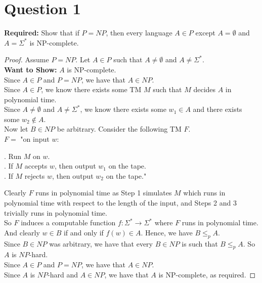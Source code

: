 \documentclass[12pt]{article}
\begin{document}

\setlength\parindent{0pt}

\section*{Question 1}

\textbf{Required:} Show that if $P = NP$, then every language $A \in P$ except $A = \emptyset$ and $A = \Sigma^*$ is NP-complete.

\begin{proof}
Assume $P = NP$. Let $A \in P$ such that $A \neq \emptyset$ and $A \neq \Sigma^*$. \\

\textbf{Want to Show:} $A$ is NP-complete. \\

Since $A \in P$ and $P = NP$, we have that $A \in NP$. \\

Since $A \in P$, we know there exists some TM $M$ such that $M$ decides $A$ in polynomial time. \\

Since $A \neq \emptyset$ and $A \neq \Sigma^*$, we know there exists some $w_1 \in A$ and there exists some $w_2 \not \in A$. \\

Now let $B \in NP$ be arbitrary. Consider the following TM $F$. \\

$F = $ "on input $w$: \\

\setlength\parindent{15pt}

. Run $M$ on $w$. \\
. If $M$ accepts $w$, then output $w_1$ on the tape. \\
. If $M$ rejects $w$, then output $w_2$ on the tape." \\

\setlength\parindent{0pt}

Clearly $F$ runs in polynomial time as Step 1 simulates $M$ which runs in polynomial time with respect to the length of the input, and Steps 2 and 3 trivially runs in polynomial time. \\

So $F$ induces a computable function $f: \Sigma^* \rightarrow \Sigma^*$ where $F$ runs in polynomial time. \\

And clearly $w \in B$ if and only if $f(w) \in A$. Hence, we have $B \leq_p A$. \\

Since $B \in NP$ was arbitrary, we have that every $B \in NP$ is such that $B \leq_p A$. So $A$ is $NP$-hard. \\

Since $A \in P$ and $P = NP$, we have that $A \in NP$. \\

Since $A$ is $NP$-hard and $A \in NP$, we have that $A$ is NP-complete, as required. 
\end{proof}
\end{document}
